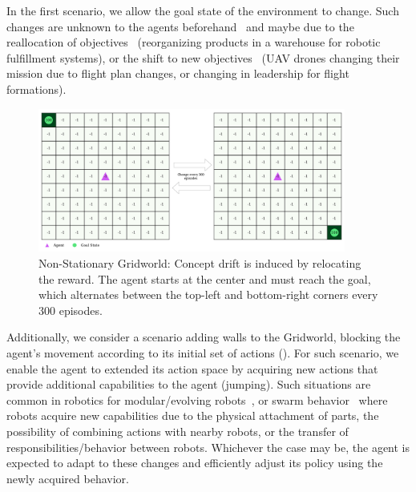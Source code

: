 In the first scenario, we allow the goal state of the environment to change. Such changes are unknown 
to the agents beforehand~\cite{cardozo21} and maybe due to the reallocation of 
objectives~\cite{khetarpal2022continualreinforcementlearningreview} (\eg reorganizing products in a 
warehouse for robotic fulfillment systems), or the shift to new objectives~\cite{florensa18} (UAV drones 
changing their mission due to flight plan changes, or changing in leadership for flight formations).

\begin{figure}[hptb]
    \centering
    \includegraphics[width=0.9\textwidth]{figures/rewards_change}
    \caption{Non-Stationary Gridworld: Concept drift is induced by relocating the reward. The agent starts at the center and must reach the goal, which alternates between the top-left and bottom-right corners every 300 episodes.}
    \label{fig:r-change}
\end{figure}

Additionally, we consider a scenario adding walls to the Gridworld, blocking the agent's movement 
according to its initial set of actions (). For such scenario, we enable the agent 
to  extended its action space by acquiring new actions that provide additional capabilities to the agent 
(\ie jumping). Such situations are common in robotics for modular/evolving 
robots~\cite{eiben20evolving,miras20environmental}, or swarm behavior~\cite{schranz20swarm} where 
robots acquire new capabilities due to the physical attachment of parts, the possibility of combining 
actions with nearby robots, or the transfer of responsibilities/behavior between robots. Whichever the 
case may be, the agent is expected to adapt to these changes and efficiently adjust its policy using 
the newly acquired behavior.


\endinput

